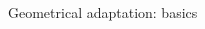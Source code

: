 \begin{frame}[c]{Geometrical adaptation: basics}
\begin{columns}[t]
\begin{column}{0.45\textwidth}
\begin{figure}

\end{figure}
\end{column}
\end{columns}
\end{frame}
